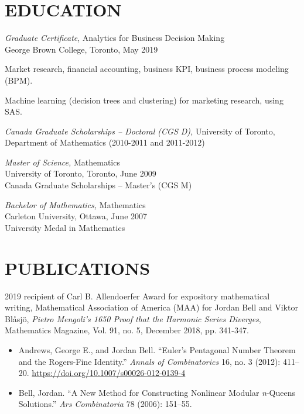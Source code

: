 \documentclass[margin, 10pt]{res} %
\begin{document}
\begin{resume}

\section{EDUCATION}

{\sl Graduate Certificate}, Analytics for Business Decision Making \\
George Brown College, Toronto, May 2019

Market research, financial accounting, business KPI, business process modeling (BPM).

Machine learning (decision trees and clustering) for marketing research, using SAS.


{\sl Canada Graduate Scholarships – Doctoral (CGS D),} University of Toronto, Department of Mathematics (2010-2011 and 2011-2012)

{\sl Master of Science,} Mathematics \\
University of Toronto, Toronto, June 2009\\
Canada Graduate Scholarships – Master's (CGS M)

{\sl Bachelor of Mathematics,} Mathematics \\
Carleton University, Ottawa, June 2007\\
University Medal in Mathematics



\section{PUBLICATIONS}

2019 recipient of Carl B. Allendoerfer Award for expository mathematical writing, Mathematical Association of America (MAA) for Jordan Bell and Viktor Blåsjö, {\em Pietro Mengoli’s 1650 Proof that the Harmonic Series Diverges}, Mathematics Magazine, Vol. 91, no. 5, December 2018, pp. 341-347.

\begin{itemize}
\item Andrews, George E., and Jordan Bell. “Euler’s Pentagonal Number Theorem and the Rogers-Fine Identity.” {\em Annals of Combinatorics} 16, no. 3 (2012): 411–20. \url{https://doi.org/10.1007/s00026-012-0139-4}

\item Bell, Jordan. “A New Method for Constructing Nonlinear Modular {\em n}-Queens Solutions.” {\em Ars Combinatoria} 78 (2006): 151–55.


\end{itemize}
\end{resume}
\end{document}
